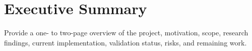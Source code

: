 \chapter*{Executive Summary}
Provide a one- to two-page overview of the project, motivation, scope, research findings, current implementation, validation status, risks, and remaining work.
